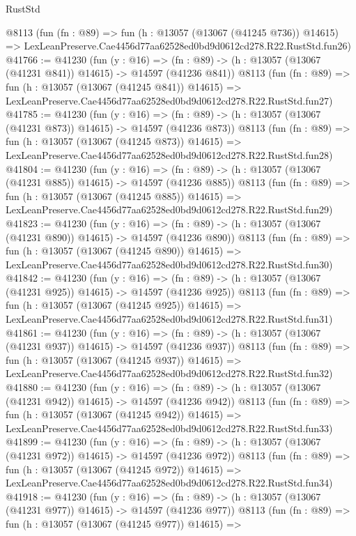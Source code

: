 \begin{lexlean}{RustStd}
\begin{coremodule}
    @8113
    (fun (fn : @89) =>
    fun (h : @13057 (@13067 (@41245 @736)) @14615) =>
    LexLeanPreserve.Cae4456d77aa62528ed0bd9d0612cd278.R22.RustStd.fun26)
@41766 := @41230
    (fun (y : @16) =>
    (fn : @89) -> (h : @13057 (@13067 (@41231 @841)) @14615) -> @14597 (@41236 @841))
    @8113
    (fun (fn : @89) =>
    fun (h : @13057 (@13067 (@41245 @841)) @14615) =>
    LexLeanPreserve.Cae4456d77aa62528ed0bd9d0612cd278.R22.RustStd.fun27)
@41785 := @41230
    (fun (y : @16) =>
    (fn : @89) -> (h : @13057 (@13067 (@41231 @873)) @14615) -> @14597 (@41236 @873))
    @8113
    (fun (fn : @89) =>
    fun (h : @13057 (@13067 (@41245 @873)) @14615) =>
    LexLeanPreserve.Cae4456d77aa62528ed0bd9d0612cd278.R22.RustStd.fun28)
@41804 := @41230
    (fun (y : @16) =>
    (fn : @89) -> (h : @13057 (@13067 (@41231 @885)) @14615) -> @14597 (@41236 @885))
    @8113
    (fun (fn : @89) =>
    fun (h : @13057 (@13067 (@41245 @885)) @14615) =>
    LexLeanPreserve.Cae4456d77aa62528ed0bd9d0612cd278.R22.RustStd.fun29)
@41823 := @41230
    (fun (y : @16) =>
    (fn : @89) -> (h : @13057 (@13067 (@41231 @890)) @14615) -> @14597 (@41236 @890))
    @8113
    (fun (fn : @89) =>
    fun (h : @13057 (@13067 (@41245 @890)) @14615) =>
    LexLeanPreserve.Cae4456d77aa62528ed0bd9d0612cd278.R22.RustStd.fun30)
@41842 := @41230
    (fun (y : @16) =>
    (fn : @89) -> (h : @13057 (@13067 (@41231 @925)) @14615) -> @14597 (@41236 @925))
    @8113
    (fun (fn : @89) =>
    fun (h : @13057 (@13067 (@41245 @925)) @14615) =>
    LexLeanPreserve.Cae4456d77aa62528ed0bd9d0612cd278.R22.RustStd.fun31)
@41861 := @41230
    (fun (y : @16) =>
    (fn : @89) -> (h : @13057 (@13067 (@41231 @937)) @14615) -> @14597 (@41236 @937))
    @8113
    (fun (fn : @89) =>
    fun (h : @13057 (@13067 (@41245 @937)) @14615) =>
    LexLeanPreserve.Cae4456d77aa62528ed0bd9d0612cd278.R22.RustStd.fun32)
@41880 := @41230
    (fun (y : @16) =>
    (fn : @89) -> (h : @13057 (@13067 (@41231 @942)) @14615) -> @14597 (@41236 @942))
    @8113
    (fun (fn : @89) =>
    fun (h : @13057 (@13067 (@41245 @942)) @14615) =>
    LexLeanPreserve.Cae4456d77aa62528ed0bd9d0612cd278.R22.RustStd.fun33)
@41899 := @41230
    (fun (y : @16) =>
    (fn : @89) -> (h : @13057 (@13067 (@41231 @972)) @14615) -> @14597 (@41236 @972))
    @8113
    (fun (fn : @89) =>
    fun (h : @13057 (@13067 (@41245 @972)) @14615) =>
    LexLeanPreserve.Cae4456d77aa62528ed0bd9d0612cd278.R22.RustStd.fun34)
@41918 := @41230
    (fun (y : @16) =>
    (fn : @89) -> (h : @13057 (@13067 (@41231 @977)) @14615) -> @14597 (@41236 @977))
    @8113
    (fun (fn : @89) =>
    fun (h : @13057 (@13067 (@41245 @977)) @14615) =>

\end{coremodule}
\end{lexlean}
